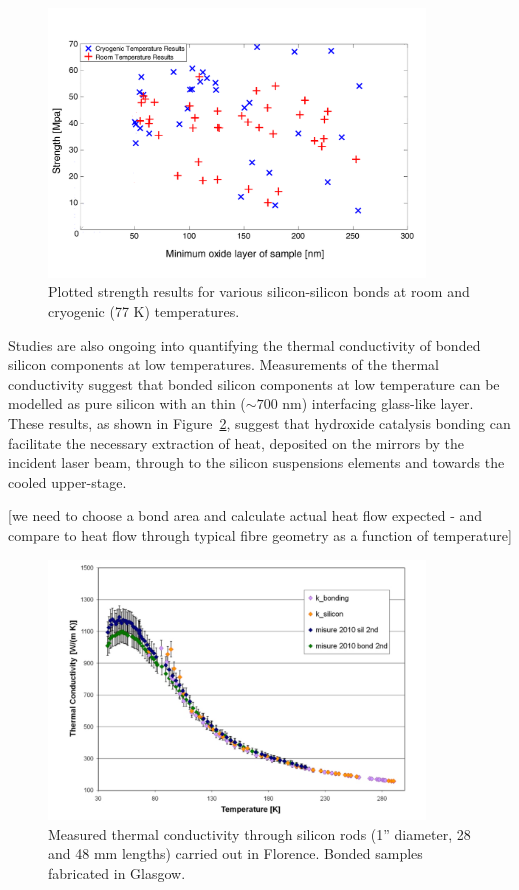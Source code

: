 \begin{figure}[htbp]
\begin{center}
\includegraphics[width=100mm]{Sec_Suspensions/Figures/silicon-bond-strengths.pdf}
\caption{Plotted strength results for various silicon-silicon bonds at room and cryogenic (77 K) temperatures.}
\label{fig:silicon-bond-strengths}
\end{center}
\end{figure}

Studies are also ongoing into quantifying the thermal conductivity of bonded silicon components at low temperatures. Measurements of the thermal conductivity suggest that bonded silicon components at low temperature can be modelled as pure silicon with an thin ($\sim 700$ nm) interfacing glass-like layer. These results, as shown in Figure~\ref{fig:silicon-bond-thermal-conductivity}, suggest that hydroxide catalysis bonding can facilitate the necessary extraction of heat, deposited on the mirrors by the incident laser beam, through to the silicon suspensions elements and towards the cooled upper-stage.

[we need to choose a bond area and calculate actual heat flow expected - and compare to heat flow through typical fibre geometry as a function of temperature]
\begin{figure}[htbp]
\begin{center}
		\includegraphics[width=100mm]{Sec_Suspensions/Figures/silicon-bond-thermal-conductivity.pdf}
			\caption{Measured thermal conductivity through silicon rods (1'' diameter, 28 and 48 mm lengths) carried out in Florence.  Bonded samples fabricated in Glasgow.}
\label{fig:silicon-bond-thermal-conductivity}
	\end{center}
\end{figure}

